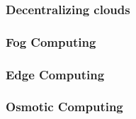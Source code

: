 \subsubsection{Decentralizing clouds}

\subsubsection{Fog Computing}

\subsubsection{Edge Computing}

\subsubsection{Osmotic Computing}
